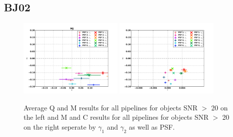\subsection{BJ02}
\begin{figure}
\centering
\includegraphics[width=0.45\textwidth]{fig/QMC_main_MJ_f.pdf} 
\includegraphics[width=0.45\textwidth]{fig/MC_main_MJ_f.pdf} 
\caption{Average Q and M results for all pipelines for objects 
SNR $>$ 20 on the left and M and C results for all pipelines for objects 
SNR $>$ 20 on the right seperate by $\gamma_{1} $ and $\gamma_{2} $ as
well as PSF.}
\label{fig:BJ_qmc}
\end{figure}

